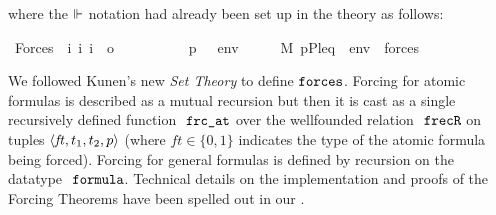 where the $\Vdash$ notation had already been set up in the theory
 as follows:
\begin{isabelle}
\isamarkupfalse%
\ Forces\ {\isacharcolon}{\kern0pt}{\isacharcolon}{\kern0pt}\ {\isachardoublequoteopen}{\isacharbrackleft}{\kern0pt}i{\isacharcomma}{\kern0pt}\ i{\isacharcomma}{\kern0pt}\ i{\isacharbrackright}{\kern0pt}\ {\isasymRightarrow}\ o{\isachardoublequoteclose}\ \ {\isacharparenleft}{\kern0pt}{\isachardoublequoteopen}{\isacharunderscore}{\kern0pt}\ {\isasymtturnstile}\ {\isacharunderscore}{\kern0pt}\ {\isacharunderscore}{\kern0pt}{\isachardoublequoteclose}\ {\isacharbrackleft}{\kern0pt}{}{}{\isacharcomma}{\kern0pt}{}{}{\isacharcomma}{\kern0pt}{}{}{\isacharbrackright}{\kern0pt}\ {}{}{\isacharparenright}{\kern0pt}\ \isanewline
\ \ {\isachardoublequoteopen}p\ {\isasymtturnstile}\ {\isasymphi}\ env\ \ \ {\isasymequiv}\ \ \ M{\isacharcomma}{\kern0pt}\ {\isacharparenleft}{\kern0pt}{\isacharbrackleft}{\kern0pt}p{\isacharcomma}{\kern0pt}P{\isacharcomma}{\kern0pt}leq{\isacharcomma}{\kern0pt}{\isasymone}{\isacharbrackright}{\kern0pt}\ {\isacharat}{\kern0pt}\ env{\isacharparenright}{\kern0pt}\ {\isasymTurnstile}\ forces{\isacharparenleft}{\kern0pt}{\isasymphi}{\isacharparenright}{\kern0pt}{\isachardoublequoteclose}\isanewline
\end{isabelle}

We followed Kunen's new \textit{Set Theory} \cite{kunen2011set} to define
$\mathop{\mathtt{forces}}$.  Forcing for atomic formulas is described as a mutual
recursion
but then \cite[p.~257]{kunen2011set} it is cast as a single
recursively defined function $\frcat$ over the wellfounded relation
$\isatt{frecR}$ on tuples $\langle \mathit{ft},t_1,t_2,p\rangle$ (where
$\mathit{ft}\in\{0,1\}$ indicates the type of the atomic formula being
forced). Forcing for general formulas is defined by recursion on the
datatype $\formula$. Technical details on the implementation and proofs of the
Forcing Theorems have been spelled out in our
\cite{2020arXiv200109715G}.

